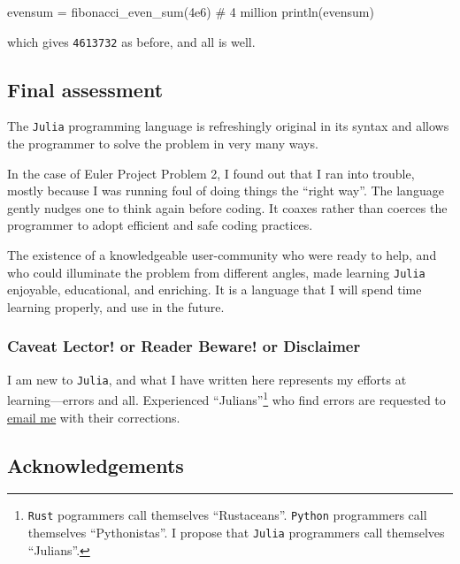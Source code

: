 \documentclass[
  a4paper,
]{article}
\newenvironment{Shaded}{\begin{snugshade}}{\end{snugshade}}
\newcommand{\CommentTok}[1]{\textcolor[rgb]{0.50,0.62,0.50}{#1}}
\newcommand{\FloatTok}[1]{\textcolor[rgb]{0.75,0.75,0.82}{#1}}
\newcommand{\FunctionTok}[1]{\textcolor[rgb]{0.94,0.94,0.56}{#1}}
\newcommand{\NormalTok}[1]{\textcolor[rgb]{0.80,0.80,0.80}{#1}}
\newcommand{\OperatorTok}[1]{\textcolor[rgb]{0.94,0.94,0.82}{#1}}
\begin{document}
\begin{Shaded}
\begin{Highlighting}[]
\NormalTok{evensum }\OperatorTok{=} \FunctionTok{fibonacci\_even\_sum}\NormalTok{(}\FloatTok{4e6}\NormalTok{) }\CommentTok{\# 4 million}
\FunctionTok{println}\NormalTok{(evensum)}
\end{Highlighting}
\end{Shaded}

which gives \texttt{4613732} as before, and all is well.

\hypertarget{final-assessment}{%
\subsection{Final assessment}\label{final-assessment}}

The \texttt{Julia} programming language is refreshingly original in its
syntax and allows the programmer to solve the problem in very many ways.

In the case of Euler Project Problem 2, I found out that I ran into
trouble, mostly because I was running foul of doing things the ``right
way''. The language gently nudges one to think again before coding. It
coaxes rather than coerces the programmer to adopt efficient and safe
coding practices.

The existence of a knowledgeable user-community who were ready to help,
and who could illuminate the problem from different angles, made
learning \texttt{Julia} enjoyable, educational, and enriching. It is a
language that I will spend time learning properly, and use in the
future.

\hypertarget{caveat-lector-or-reader-beware-or-disclaimer}{%
\subsubsection{Caveat Lector! or Reader Beware! or
Disclaimer}\label{caveat-lector-or-reader-beware-or-disclaimer}}

I am new to \texttt{Julia}, and what I have written here represents my
efforts at learning---errors and all. Experienced ``Julians''\footnote{\texttt{Rust}
  pogrammers call themselves ``Rustaceans''. \texttt{Python} programmers
  call themselves ``Pythonistas''. I propose that \texttt{Julia}
  programmers call themselves ``Julians''.} who find errors are
requested to \href{mailto:feedback.swanlotus@gmail.com}{email me} with
their corrections.  \normalfont

\hypertarget{acknowledgements}{%
\subsection{Acknowledgements}\label{acknowledgements}}
\end{document}
